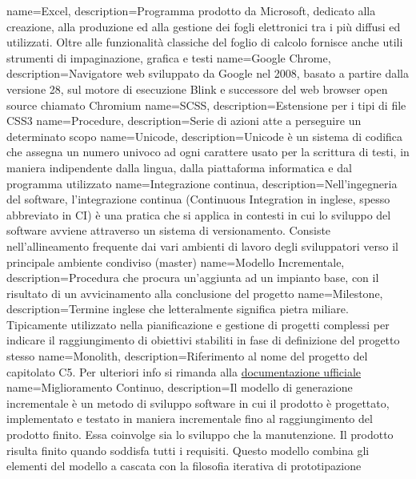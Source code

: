  {
	name=Excel,
	description={Programma prodotto da Microsoft, dedicato alla creazione, alla produzione ed alla gestione dei fogli elettronici tra i più diffusi ed utilizzati. Oltre alle funzionalità classiche del foglio di calcolo fornisce anche utili strumenti di impaginazione, grafica e testi}
}
 {
	name=Google Chrome,
	description={Navigatore web sviluppato da Google nel 2008, basato a partire dalla versione 28, sul motore di esecuzione Blink e successore del web browser open source chiamato Chromium}
}
 {
	name=SCSS,
	description={Estensione per i tipi di file CSS3}
}
 {
	name=Procedure,
	description={Serie di azioni atte a perseguire un determinato scopo}
}
 {
	name=Unicode,
	description={Unicode è un sistema di codifica che assegna un numero univoco ad ogni carattere usato per la scrittura di testi, in maniera indipendente dalla lingua, dalla piattaforma informatica e dal programma utilizzato}
}
 {
	name=Integrazione continua,
	description={Nell'ingegneria del software, l'integrazione continua (Continuous Integration in inglese, spesso abbreviato in CI) è una pratica che si applica in contesti in cui lo sviluppo del software avviene attraverso un sistema di versionamento. Consiste nell'allineamento frequente dai vari ambienti di lavoro degli sviluppatori verso il principale ambiente condiviso (master)}
}
 {
	name=Modello Incrementale,
	description={Procedura che procura un'aggiunta ad un impianto base, con il risultato di un avvicinamento alla conclusione del progetto}
}
 {
	name=Milestone,
	description={Termine inglese che letteralmente significa pietra miliare. Tipicamente utilizzato nella pianificazione e gestione di progetti complessi per indicare il raggiungimento di obiettivi stabiliti in fase di definizione del progetto stesso}
}
 {
	name=Monolith,
	description={Riferimento al nome del progetto del capitolato C5. Per ulteriori info si rimanda alla \href{http://www.math.unipd.it/~tullio/IS-1/2016/Progetto/C5.pdf}{documentazione ufficiale}}
}
 {
	name=Miglioramento Continuo,
	description={Il modello di generazione incrementale è un metodo di sviluppo software in cui il prodotto è progettato, implementato e testato in maniera incrementale fino al raggiungimento del prodotto finito. Essa coinvolge sia lo sviluppo che la manutenzione. Il prodotto risulta finito quando soddisfa tutti i requisiti. Questo modello combina gli elementi del modello a cascata con la filosofia iterativa di prototipazione}
}
